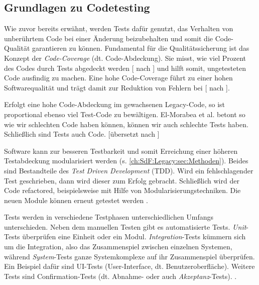 \subsection{Grundlagen zu Codetesting}
\label{ch:SdF:Legacy:sec:TestPyramide}

Wie zuvor bereits erwähnt, werden Tests dafür genutzt, das Verhalten von unberührtem Code bei einer Änderung beizubehalten und somit die Code-Qualität garantieren zu können. Fundamental für die Qualitätssicherung ist das Konzept der \textit{Code-Coverage} (dt. Code-Abdeckung). Sie misst, \glqq wie viel Prozent des Codes durch Tests abgedeckt werden\grqq{} %
[\cite{IleneBurnstein:2003} nach \cite[S. 13]{Oppel:2025}] und hilft somit, ungetesteten Code ausfindig zu machen. Eine hohe Code-Coverage führt zu einer hohen Softwarequalität und trägt damit zur Reduktion von Fehlern bei [\cite{IleneBurnstein:2003} nach \cite[S. 13]{Oppel:2025}]. %

Erfolgt eine hohe Code-Abdeckung im gewachsenen Legacy-Code, so ist  proportional ebenso viel Test-Code zu bewältigen.
El-Morabea et al. betont \glqq so wie wir schlechten Code haben können, können wir auch schlechte Tests haben. Schließlich sind Tests auch Code. \grqq{} [übersetzt nach \cite[S. 3]{ElMorabea:2021}]

Software kann zur besseren Testbarkeit und somit Erreichung einer höheren Testabdeckung modularisiert werden (s. \autoref{ch:SdF:Legacy:sec:Methoden}). Beides sind Bestandteile des \textit{Test Driven Development} (TDD). Wird ein fehlschlagender Test geschrieben, dann wird dieser zum Erfolg gebracht. Schließlich wird der Code refactored, beispielsweise mit Hilfe von Modularisierungstechniken. Die neuen Module können erneut getestet werden \cites[S. 8]{ElMorabea:2021}[S. 19]{Stantchev:2010}.

Tests werden in verschiedene Testphasen unterschiedlichen Umfangs unterschieden. Neben dem manuellen Testen gibt es automatisierte Tests. \textit{Unit}-Tests überprüfen eine Einheit oder ein Modul. \textit{Integration}-Tests kümmern sich um die Integration, also das Zusammenspiel zwischen einzelnen Systemen, während \textit{System}-Tests ganze Systemkomplexe auf ihr Zusammenspiel überprüfen. Ein Beispiel dafür sind UI-Tests (User-Interface, dt. Benutzeroberfläche). Weitere Tests sind Confirmation-Tests (dt. Abnahme- oder auch \textit{Akzeptanz}-Tests). \cites[S. 2, 81\psqq]{ElMorabea:2021}[S. 18]{Oppel:2025}[S. 6]{Pi:2020}.

